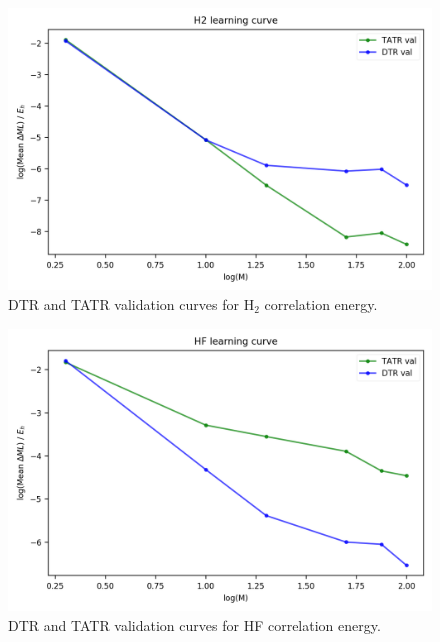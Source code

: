 \begin{figure}
    \centering
    \includegraphics[scale=1.0]{p2/figures/si/H2_learn_log_e.png}
    \caption{DTR and TATR validation curves for H$_2$ correlation energy.}
\end{figure}

\begin{figure}
    \centering
    \includegraphics[scale=1.0]{p2/figures/si/HF_learn_log_e.png}
    \caption{DTR and TATR validation curves for HF correlation energy.}
\end{figure}

